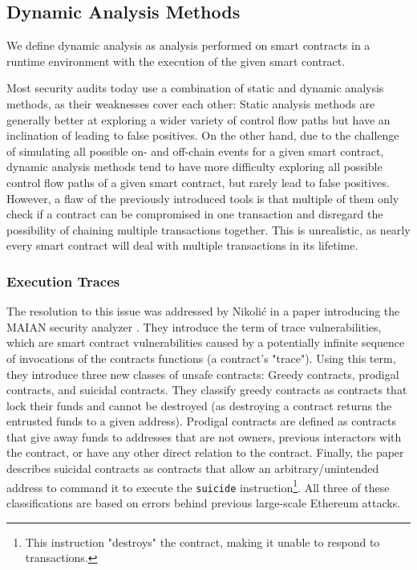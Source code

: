 \documentclass[letterpaper,twocolumn,10pt]{article}
\begin{document}
\subsection{Dynamic Analysis Methods}

We define dynamic analysis as analysis performed on smart contracts in a runtime environment with the execution of the given smart contract.


Most security audits today use a combination of static and dynamic analysis methods, as their weaknesses cover each other: Static analysis methods are generally better at exploring a wider variety of control flow paths but have an inclination of leading to false positives. On the other hand, due to the challenge of simulating all possible on- and off-chain events for a given smart contract, dynamic analysis methods tend to have more difficulty exploring all possible control flow paths of a given smart contract, but rarely lead to false positives. However, a flaw of the previously introduced tools is that multiple of them only check if a contract can be compromised in one transaction and disregard the possibility of chaining multiple transactions together. This is unrealistic, as nearly every smart contract will deal with multiple transactions in its lifetime.

\subsubsection{Execution Traces}
The resolution to this issue was addressed by Nikolić in a paper introducing the MAIAN security analyzer \cite{nikolic_kolluri_sergey_saxena_hobor_2018}. They introduce the term of trace vulnerabilities, which are smart contract vulnerabilities caused by a potentially infinite sequence of invocations of the contracts functions (a contract's "trace"). Using this term, they introduce three new classes of unsafe contracts: Greedy contracts, prodigal contracts, and suicidal contracts. They classify greedy contracts as contracts that lock their funds and cannot be destroyed (as destroying a contract returns the entrusted funds to a given address). Prodigal contracts are defined as contracts that give away funds to addresses that are not owners, previous interactors with the contract, or have any other direct relation to the contract. Finally, the paper describes suicidal contracts as contracts that allow an arbitrary/unintended address to command it to execute the \verb|suicide| instruction\footnote{This instruction "destroys" the contract, making it unable to respond to transactions.}. All three of these classifications are based on errors behind previous large-scale Ethereum attacks. 
\end{document}
